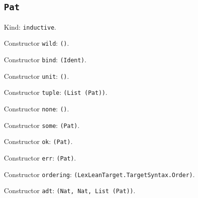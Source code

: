 \documentclass[11pt]{article}
\begin{document}
\subsection*{\texttt{Pat}}
\noindent Kind: \texttt{inductive}.\par
\noindent Constructor \texttt{wild}: \texttt{()}.\par
\noindent Constructor \texttt{bind}: \texttt{(Ident)}.\par
\noindent Constructor \texttt{unit}: \texttt{()}.\par
\noindent Constructor \texttt{tuple}: \texttt{(List (Pat))}.\par
\noindent Constructor \texttt{none}: \texttt{()}.\par
\noindent Constructor \texttt{some}: \texttt{(Pat)}.\par
\noindent Constructor \texttt{ok}: \texttt{(Pat)}.\par
\noindent Constructor \texttt{err}: \texttt{(Pat)}.\par
\noindent Constructor \texttt{ordering}: \texttt{(LexLeanTarget.TargetSyntax.Order)}.\par
\noindent Constructor \texttt{adt}: \texttt{(Nat, Nat, List (Pat))}.\par
\end{document}

